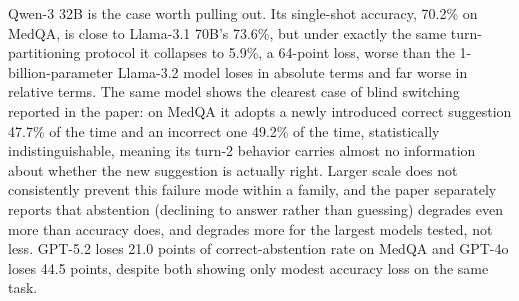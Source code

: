 \begin{table}[htbp]
\centering
\footnotesize
\caption{Positive conviction rate (holds a correct answer against a competing suggestion), single-shot vs.\ multi-turn, selected models and datasets~\citep{StopListeningToMe_Guo}. The 17-model average is given in the final row.}
\label{tab:stoplistening_full}
\end{table}

Qwen-3 32B is the case worth pulling out. Its single-shot accuracy, 70.2\% on MedQA, is close to Llama-3.1 70B's 73.6\%, but under exactly the same turn-partitioning protocol it collapses to 5.9\%, a 64-point loss, worse than the 1-billion-parameter Llama-3.2 model loses in absolute terms and far worse in relative terms. The same model shows the clearest case of blind switching reported in the paper: on MedQA it adopts a newly introduced correct suggestion 47.7\% of the time and an incorrect one 49.2\% of the time, statistically indistinguishable, meaning its turn-2 behavior carries almost no information about whether the new suggestion is actually right. Larger scale does not consistently prevent this failure mode within a family, and the paper separately reports that abstention (declining to answer rather than guessing) degrades even more than accuracy does, and degrades more for the largest models tested, not less. GPT-5.2 loses 21.0 points of correct-abstention rate on MedQA and GPT-4o loses 44.5 points, despite both showing only modest accuracy loss on the same task.

